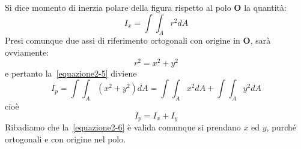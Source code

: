\noindent Si dice momento di inerzia polare della figura rispetto al polo $\mathbf{O}$ la quantità:
\begin{equation} \label{equazione2-5}
\boxed{I_x = \int\int_A r^{2}dA}
\tag{2.5}
\end{equation}
Presi comunque due assi di riferimento ortogonali con origine in $\mathbf{O}$, sarà ovviamente: 
\begin{equation*}
r^2 = x^2 + y^2
\end{equation*}
e pertanto la~\eqref{equazione2-5} diviene
\begin{equation*}
I_p = \int\int_A (x^2+y^2)dA = \int\int_A x^{2}dA + \int\int_A y^{2}dA
\end{equation*}
cioè
\begin{equation} \label{equazione2-6}
\boxed{I_p = I_x + I_y}
\tag{2.6}
\end{equation}
Ribadiamo che la~\eqref{equazione2-6} è valida comunque si prendano $x$ ed $y$, purché ortogonali e con origine nel polo.
